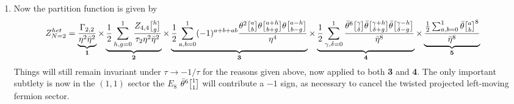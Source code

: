 \documentclass[11pt, class=article, crop=false]{standalone}
\begin{document}
\begin{enumerate}
	\item Now the partition function is given by
	\[\hspace{-.2in}
		Z^{het}_{N=2} = \underbrace{\frac{\Gamma_{2,2}}{\eta^2 \bar \eta^2}}_{\mathbf{1}} 
		\times \underbrace{\frac12 \sum_{h,g=0}^1 \frac{Z_{4,4} \twist{h}{g}}{\tau_2 \eta^2 \bar \eta^2} }_{\mathbf{2}}
		\times \underbrace{\frac12 \sum_{a,b=0}^1 (-1)^{a+b+ab} \frac{\theta^2 \twist{a}{b} \theta \twist{a+h}{b+g} \theta \twist{a-h}{b-g}}{\eta^4}}_{\mathbf{3}}
		\times \underbrace{\frac12 \sum_{\gamma,\delta=0}^1 \frac{\bar \theta^6 \twist{\gamma}{\delta} \bar \theta \twist{\gamma+h}{\delta+g} \bar \theta \twist{\gamma-h}{\delta-g}}{\bar \eta^8} }_{\mathbf{4}}
		 \times \underbrace{\frac{\frac12 \sum_{a,b=0}^1 \bar \theta \twist ab^8 }{\bar \eta^{8}}}_{\mathbf{5}}
	\]
	Things will still remain invariant under $\tau \to -1/\tau$ for the reasons given above, now applied to both \textbf{3} and \textbf{4}. The only important subtlety is now in the $(1,1)$ sector the $E_8$ $\bar \theta^6 \twist11$ will contribute a $-1$ sign, as necessary to cancel the twisted projected left-moving fermion sector. 
	

\end{enumerate}
\end{document}
